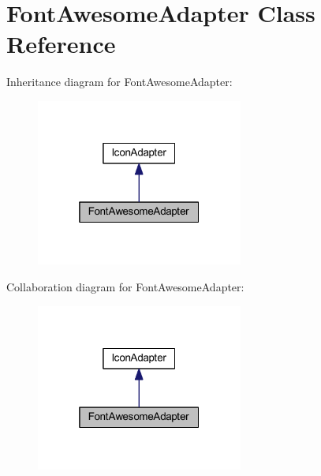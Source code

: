 \hypertarget{classhamburgscleanest_1_1_data_tables_1_1_models_1_1_column_formatters_1_1_adapters_1_1_icon_1_1_font_awesome_adapter}{}\section{Font\+Awesome\+Adapter Class Reference}
\label{classhamburgscleanest_1_1_data_tables_1_1_models_1_1_column_formatters_1_1_adapters_1_1_icon_1_1_font_awesome_adapter}


Inheritance diagram for Font\+Awesome\+Adapter\+:
\nopagebreak
\begin{figure}[H]
\begin{center}
\leavevmode
\includegraphics[width=193pt]{classhamburgscleanest_1_1_data_tables_1_1_models_1_1_column_formatters_1_1_adapters_1_1_icon_1_1ad817f17574499780f7a4911ebbd3b5c}
\end{center}
\end{figure}


Collaboration diagram for Font\+Awesome\+Adapter\+:
\nopagebreak
\begin{figure}[H]
\begin{center}
\leavevmode
\includegraphics[width=193pt]{classhamburgscleanest_1_1_data_tables_1_1_models_1_1_column_formatters_1_1_adapters_1_1_icon_1_10a955a1b56f61866b26c15dc9925fe9a}
\end{center}
\end{figure}
